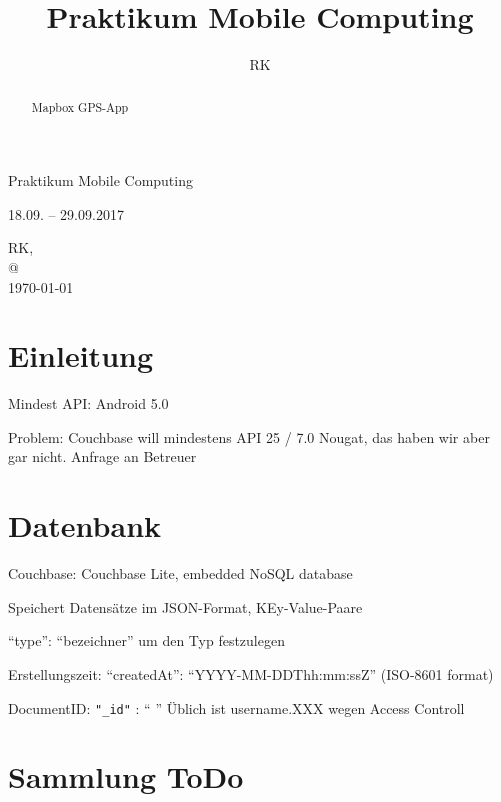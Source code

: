 \documentclass[a4paper, 10pt]{scrartcl}
\title{Praktikum Mobile Computing}
\author{RK}		%
\begin{document}
\begin{titlepage}
   
   \begin{center}
   \vspace*{4cm}
      \huge{Praktikum Mobile Computing}\\
      \vspace{1cm}
      
      \Large{18.09. – 29.09.2017}
      
      \vfill
      \Large{RK, }\\		%
      \large{@}\\	%
      \vspace{1cm}
      \today
      
      \vspace*{2cm}
      
      
   \end{center}
   
\end{titlepage}

\tableofcontents

\newpage

\begin{abstract}
Mapbox GPS-App
\end{abstract}

\newpage

\section{Einleitung}

Mindest API: Android 5.0 

Problem: Couchbase will mindestens API 25 / 7.0 Nougat, das haben wir aber gar nicht.
Anfrage an Betreuer

\section{Datenbank}

Couchbase:  Couchbase Lite, embedded NoSQL database

Speichert Datensätze im JSON-Format, KEy-Value-Paare

``type'': ``bezeichner'' um den Typ festzulegen

Erstellungszeit: ``createdAt'':  ``YYYY-MM-DDThh:mm:ssZ'' (ISO-8601 format)

DocumentID: \lstinline{"_id"} : `` '' Üblich ist username.XXX wegen Access Controll

\section{Sammlung ToDo}
\end{document}
